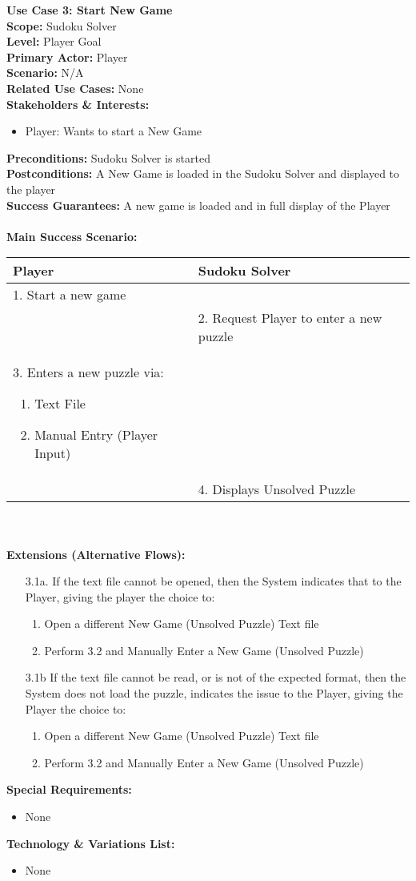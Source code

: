 \documentclass[letterpaper]{article}
\begin{document}
\noindent
\textbf{Use Case 3:  Start New Game}\\
\textbf{Scope:  }Sudoku Solver\\
\textbf{Level:  }Player Goal\\
\textbf{Primary Actor:  }Player\\
\textbf{Scenario:  }N/A\\
\textbf{Related Use Cases:  }None\\
\textbf{Stakeholders \& Interests:}
\begin{itemize}
\item Player:  Wants to start a New Game
\end{itemize}
\textbf{Preconditions:  }Sudoku Solver is started\\
\textbf{Postconditions:  }A New Game is loaded in the Sudoku Solver
and displayed to the player\\
\textbf{Success Guarantees: }A new game is loaded and in full display
of the Player\\\\
\textbf{Main Success Scenario:  }\\
\begin{tabular}{|p{5.75cm}|p{5.75cm}|}\hline
\textbf{Player} & \textbf{Sudoku Solver}\\\hline
1.  Start a new game & \\\hline
& 2. Request Player to enter a new puzzle\\\hline
3. Enters a new puzzle via:
\begin{enumerate}
\item Text File
\item Manual Entry (Player Input)
\end{enumerate} & \\\hline
& 4. Displays Unsolved Puzzle\\\hline
\end{tabular}\\\\
\textbf{Extensions (Alternative Flows):}
\begin{itemize}
\item[3.1a.]If the text file cannot be opened, then the System
indicates that to the Player, giving the player the choice to:
\begin{enumerate}
\item Open a different New Game (Unsolved Puzzle) Text file
\item Perform 3.2 and Manually Enter a New Game (Unsolved Puzzle)
\end{enumerate}
\item[3.1b]If the text file cannot be read, or is not of the expected
 format, then the System does not load the puzzle, indicates the issue
 to the Player, giving the Player the choice to:
\begin{enumerate}
\item Open a different New Game (Unsolved Puzzle) Text file
\item Perform 3.2 and Manually Enter a New Game (Unsolved Puzzle)
\end{enumerate}
\end{itemize}
\textbf{Special Requirements: }
\begin{itemize}
\item None
\end{itemize}
\textbf{Technology \& Variations List:}
\begin{itemize}
\item None
\end{itemize}
\end{document}
